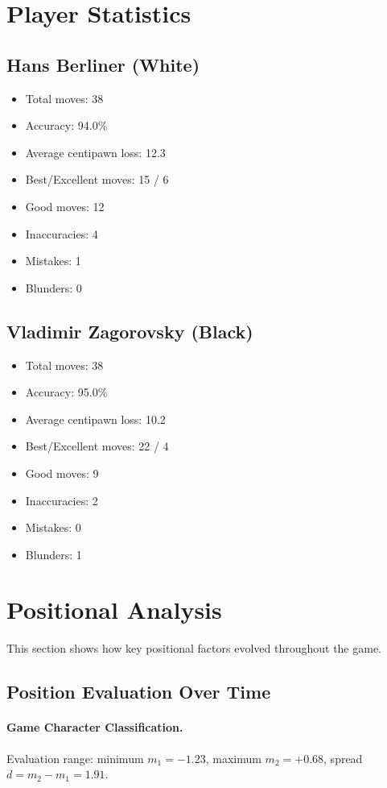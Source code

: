 \documentclass[11pt]{book}
\begin{document}
\section{Player Statistics}

\subsection{Hans Berliner (White)}
\begin{itemize}
\item Total moves: 38
\item Accuracy: 94.0\%
\item Average centipawn loss: 12.3
\item Best/Excellent moves: 15 / 6
\item Good moves: 12
\item Inaccuracies: 4
\item Mistakes: 1
\item Blunders: 0
\end{itemize}

\subsection{Vladimir Zagorovsky (Black)}
\begin{itemize}
\item Total moves: 38
\item Accuracy: 95.0\%
\item Average centipawn loss: 10.2
\item Best/Excellent moves: 22 / 4
\item Good moves: 9
\item Inaccuracies: 2
\item Mistakes: 0
\item Blunders: 1
\end{itemize}

\section{Positional Analysis}

This section shows how key positional factors evolved throughout the game.

\subsection{Position Evaluation Over Time}

\paragraph{Game Character Classification.}
Evaluation range: minimum $m_1 = -1.23$, maximum $m_2 = +0.68$, spread $d = m_2 - m_1 = 1.91$.
\end{document}
